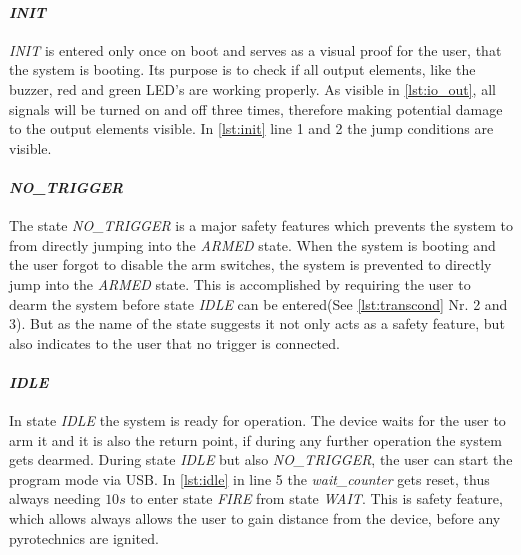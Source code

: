

\paragraph{\textit{INIT}}
\textit{INIT} is entered only once on boot and serves as a visual proof for the user, that the system is booting. Its purpose is to check if all output elements, like the buzzer, red and green LED's are working properly. As visible in \cref{lst:io_out}, all signals will be turned on and off three times, therefore making potential damage to the output elements  visible. In \cref{lst:init} line 1 and 2 the jump conditions are visible.\\




\paragraph{\textit{NO\_TRIGGER}}
The state \textit{NO\_TRIGGER} is a major safety features which prevents the system to from directly jumping into the \textit{ARMED} state. When the system is booting and the user forgot to disable the arm switches, the system is prevented to directly jump into the \textit{ARMED} state. This is accomplished by requiring the user to dearm the system before state \textit{IDLE} can be entered(See \cref{lst:transcond} Nr. 2 and 3). But as the name of the state suggests it not only acts as a safety feature, but also indicates to the user that no trigger is connected. \\



\pagebreak

\paragraph{\textit{IDLE}}
In state \textit{IDLE} the system is ready for operation. The device waits for the user to arm it and it is also the return point, if during any further operation the system gets dearmed. During state \textit{IDLE} but also \textit{NO\_TRIGGER}, the user can start the program mode via USB. In \cref{lst:idle} in line 5 the \textit{wait\_counter} gets reset, thus always needing $10s$ to enter state \textit{FIRE} from state \textit{WAIT}. This is safety feature, which allows always allows the user to gain distance from the device, before any pyrotechnics are ignited.

